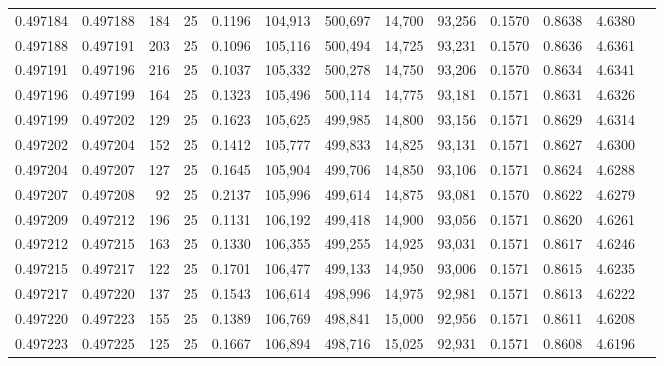 \begin{tabular}{rrrrrrrrrrrrr}
0.497184 & 0.497188 & 184 &  25 &                                     0.1196 & 104,913 & 500,697 &  14,700 &  93,256 & 0.1570 & 0.8638 & 4.6380 \\
0.497188 & 0.497191 & 203 &  25 &                                     0.1096 & 105,116 & 500,494 &  14,725 &  93,231 & 0.1570 & 0.8636 & 4.6361 \\
0.497191 & 0.497196 & 216 &  25 &                                     0.1037 & 105,332 & 500,278 &  14,750 &  93,206 & 0.1570 & 0.8634 & 4.6341 \\
0.497196 & 0.497199 & 164 &  25 &                                     0.1323 & 105,496 & 500,114 &  14,775 &  93,181 & 0.1571 & 0.8631 & 4.6326 \\
0.497199 & 0.497202 & 129 &  25 &                                     0.1623 & 105,625 & 499,985 &  14,800 &  93,156 & 0.1571 & 0.8629 & 4.6314 \\
0.497202 & 0.497204 & 152 &  25 &                                     0.1412 & 105,777 & 499,833 &  14,825 &  93,131 & 0.1571 & 0.8627 & 4.6300 \\
0.497204 & 0.497207 & 127 &  25 &                                     0.1645 & 105,904 & 499,706 &  14,850 &  93,106 & 0.1571 & 0.8624 & 4.6288 \\
0.497207 & 0.497208 &  92 &  25 &                                     0.2137 & 105,996 & 499,614 &  14,875 &  93,081 & 0.1570 & 0.8622 & 4.6279 \\
0.497209 & 0.497212 & 196 &  25 &                                     0.1131 & 106,192 & 499,418 &  14,900 &  93,056 & 0.1571 & 0.8620 & 4.6261 \\
0.497212 & 0.497215 & 163 &  25 &                                     0.1330 & 106,355 & 499,255 &  14,925 &  93,031 & 0.1571 & 0.8617 & 4.6246 \\
0.497215 & 0.497217 & 122 &  25 &                                     0.1701 & 106,477 & 499,133 &  14,950 &  93,006 & 0.1571 & 0.8615 & 4.6235 \\
0.497217 & 0.497220 & 137 &  25 &                                     0.1543 & 106,614 & 498,996 &  14,975 &  92,981 & 0.1571 & 0.8613 & 4.6222 \\
0.497220 & 0.497223 & 155 &  25 &                                     0.1389 & 106,769 & 498,841 &  15,000 &  92,956 & 0.1571 & 0.8611 & 4.6208 \\
0.497223 & 0.497225 & 125 &  25 &                                     0.1667 & 106,894 & 498,716 &  15,025 &  92,931 & 0.1571 & 0.8608 & 4.6196 \\

\end{tabular}
